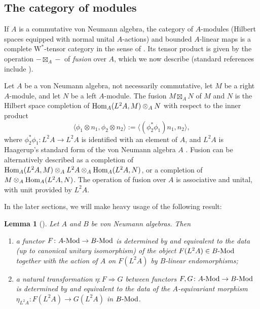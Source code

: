 \documentclass[10pt,a4paper,oneside]{amsart}
\newtheorem{lemma}[theorem]{Lemma}
\theoremstyle{remark}
\theoremstyle{definition}
\newcommand{\lmod}[1]{#1\textnormal{-Mod}}
\newcommand{\Hom}{\textnormal{Hom}}
\newcommand{\rar}{\rightarrow}
\newcommand{\cofu}[1]{\mathop{\boxtimes}_{#1}}
\begin{document}
\subsection{The category of modules}
If $A$ is a commutative von Neumann algebra,
the category %
of $A$-modules (Hilbert spaces equipped with normal unital $A$-actions) and bounded $A$-linear maps  is a complete $\mathrm{W}^*$-tensor category in the sense of \cite{Henriques2024}. Its tensor product is given by the operation $-\boxtimes_A-$ of \emph{fusion} over $A$, which we now describe (standard references include \cite{Sauvageot1983,Connes1994}).


Let $A$ be a von Neumann algebra, not necessarily commutative, 
let $M$ be a right $A$-module, and let $N$ be a left $A$-module. The fusion $M\cofu{A} N$ of $M$ and $N$ is the Hilbert space completion of $\Hom_A(L^2 A, M)\otimes_A N$
with respect to the inner product
\begin{equation}\label{e:innerprodonfusion}
    \langle
\phi_1\otimes n_1,\phi_2\otimes n_2
\rangle:=\langle (\phi_2^*\phi_1)
n_1,n_2
\rangle,
\end{equation} 
where $\phi_2^*\phi_1:L^2A\to L^2A$ is identified with an element of $A$, and $L^2A$ is Haagerup's standard form of the von Neumann algebra $A$ \cite{Haagerup}.
Fusion can be alternatively described as a completion of $\Hom_A(L^2 A, M)\otimes_A L^2A\otimes_A \Hom_A(L^2A,N)$, or a completion of $M\otimes_A \Hom_A(L^2A,N)$. 
The operation of fusion over $A$ is associative and unital, with unit provided by $L^2A$.


In the later sections,
we will make heavy usage of the following result:%
\begin{lemma} [{\cite[Cor 3.25]{Henriques2024}}]\label{lem:mainlemma}
	Let $A$ and $B$ be von Neumann algebras. Then
	\begin{enumerate}
		\item a functor $F\colon \lmod{A}\rightarrow \lmod{B}$ is determined by and equivalent to the data (up to canonical unitary isomorphism) of the object $F(L^2A)\in \lmod{B}$ together with the action of $A$ on $F(L^2A)$ by $B$-linear endomorphisms;
		\item a natural transformation $\eta\colon F \Rightarrow G$ between functors $F, G\colon \lmod{A}\rar \lmod{B}$ is determined by and equivalent to the data of the $A$-equivariant morphism $\eta_{L^2A}:F(L^2A)\rar G(L^2A)$ in $\lmod{B}$.
	\end{enumerate} 
\end{lemma}
\end{document}
